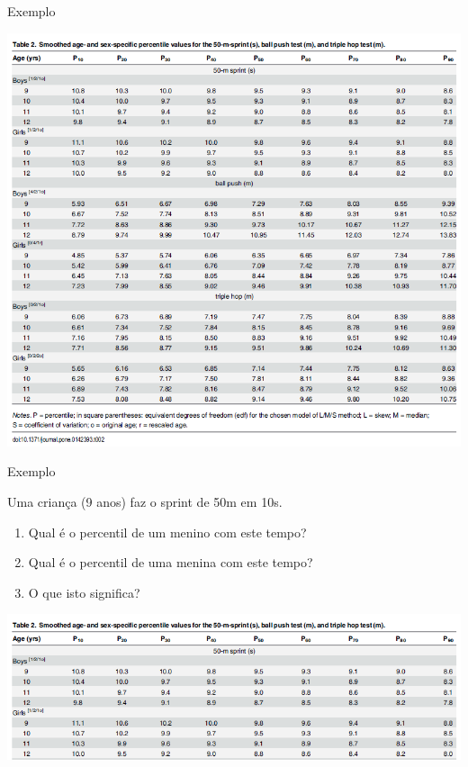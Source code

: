 \documentclass{beamer}
\begin{document}
\begin{frame}{Exemplo}
  \begin{center}
    \includegraphics[height=\textheight]{Cap3/percentil1}
  \end{center}
\end{frame}

\begin{frame}{Exemplo}
  \begin{exampleblock}{}
    Uma criança (9 anos) faz o sprint de 50m em 10s.

    \begin{enumerate}
    \item Qual é o percentil de um menino com este tempo?
    \item Qual é o percentil de uma menina com este tempo?
    \item O que isto significa?
    \end{enumerate}
  \end{exampleblock}
  \begin{center}
    \includegraphics[width=1.2\textwidth]{Cap3/percentil2}
  \end{center}
\end{frame}
\end{document}
